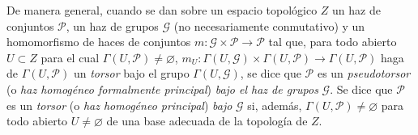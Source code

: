 \begin{env}[16.5.15]
\label{IV.16.5.15}
De manera general, cuando se dan sobre un espacio topológico $Z$ un
haz de conjuntos $\mathscr{P}$, un haz de grupos $\mathscr{G}$ (no
necesariamente conmutativo) y un homomorfismo de haces de conjuntos
$m:\mathscr{G}\times\mathscr{P}\to\mathscr{P}$ tal que, para todo abierto
$U\subset Z$ para el cual $\Gamma(U,\mathscr{P})\neq\varnothing$,
$m_U:\Gamma(U,\mathscr{G})\times\Gamma(U,\mathscr{P})\to\Gamma(U,\mathscr{P})$
haga de $\Gamma(U,\mathscr{P})$ un \emph{torsor} bajo el grupo
$\Gamma(U,\mathscr{G})$, se dice que $\mathscr{P}$ es un
\emph{pseudotorsor} (o \emph{haz homogéneo formalmente principal})
\emph{bajo el haz de grupos} $\mathscr{G}$. Se dice que $\mathscr{P}$ es un
\emph{torsor} (o \emph{haz homogéneo principal}) \emph{bajo} $\mathscr{G}$ si,
además, $\Gamma(U,\mathscr{P})\neq\varnothing$ para todo abierto
$U\neq\varnothing$ de una base adecuada de la topología de $Z$.


\end{env}
